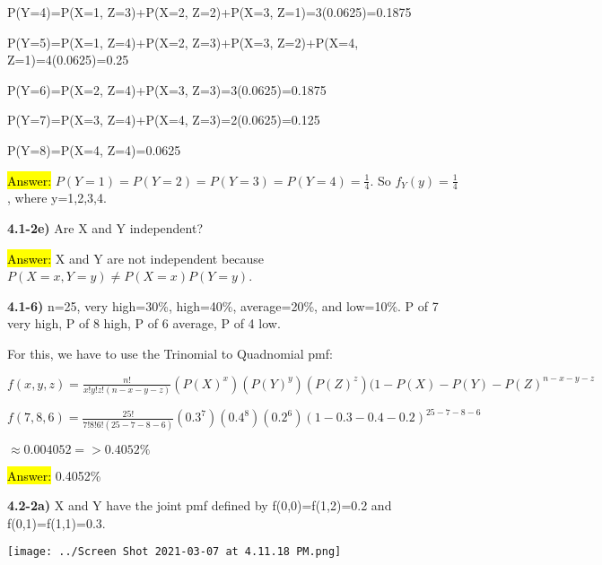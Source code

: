 \documentclass{article}
\begin{document}
P(Y=4)=P(X=1, Z=3)+P(X=2, Z=2)+P(X=3, Z=1)=3(0.0625)=0.1875

P(Y=5)=P(X=1, Z=4)+P(X=2, Z=3)+P(X=3, Z=2)+P(X=4, Z=1)=4(0.0625)=0.25

P(Y=6)=P(X=2, Z=4)+P(X=3, Z=3)=3(0.0625)=0.1875

P(Y=7)=P(X=3, Z=4)+P(X=4, Z=3)=2(0.0625)=0.125

P(Y=8)=P(X=4, Z=4)=0.0625

\hl{Answer:} $P(Y=1)=P(Y=2)=P(Y=3)=P(Y=4)=\frac{1}{4}$. So $f_{Y}(y)=\frac{1}{4}$, where y=1,2,3,4.




\vspace{4mm}

\textbf{4.1-2e)} Are X and Y independent?

\vspace{2mm}

\hl{Answer:} X and Y are not independent because $P(X=x,Y=y) \ne P(X=x)P(Y=y)$.















\newpage
\textbf{4.1-6)} n=25, very high=30\%, high=40\%, average=20\%, and low=10\%. P of 7 very high, P of 8 high, P of 6 average, P of 4 low. 

For this, we have to use the Trinomial to Quadnomial pmf:

$f(x,y,z)=\frac{n!}{x!y!z!(n-x-y-z)}(P(X)^{x})(P(Y)^{y})(P(Z)^{z})(1-P(X)-P(Y)-P(Z)^{n-x-y-z}$


$f(7,8,6)=\frac{25!}{7!8!6!(25-7-8-6)}(0.3^{7})(0.4^{8})(0.2^{6})(1-0.3-0.4-0.2)^{25-7-8-6}$

$\approx 0.004052 => 0.4052\%$


\vspace{2mm}

\hl{Answer:} 0.4052\%


\newpage
\textbf{ 4.2-2a)} X and Y have the joint pmf defined by f(0,0)=f(1,2)=0.2 and f(0,1)=f(1,1)=0.3. 

\texttt{[image: ../Screen Shot 2021-03-07 at 4.11.18 PM.png]}



\vspace{4mm}
\end{document}
